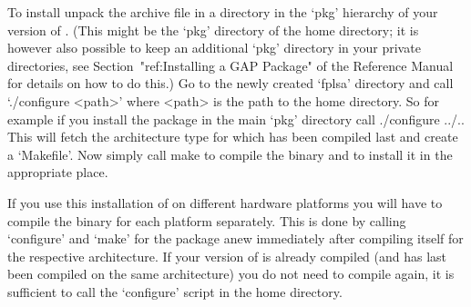 To install unpack the archive file in a directory in the `pkg' hierarchy
of your version of {\GAP}.
(This might be the `pkg' directory of the {\GAP} home directory;
it is however also possible to keep an additional `pkg' directory in your
private directories, see Section~"ref:Installing a GAP Package"
of the {\GAP} Reference Manual for details on how to do this.)
Go to the newly created `fplsa' directory and call `./configure <path>'
where <path> is the path to the {\GAP} home directory.
So for example if you install the package in the main `pkg' directory call
\begintt
./configure ../..
\endtt
This will fetch the architecture type for which {\GAP} has been compiled last
and create a `Makefile'. 
Now simply call
\begintt
make
\endtt
to compile the binary and to install it in the appropriate place.

If you use this installation of {\GAP} on different hardware platforms you will
have to compile the binary for each platform separately. This is done by
calling `configure' and `make' for the package anew immediately after
compiling {\GAP} itself for the respective architecture.
If your version of {\GAP} is already compiled (and has last been compiled on
the same architecture) you do not need to compile {\GAP}
again, it is sufficient to call the `configure' script in the {\GAP} home
directory.



